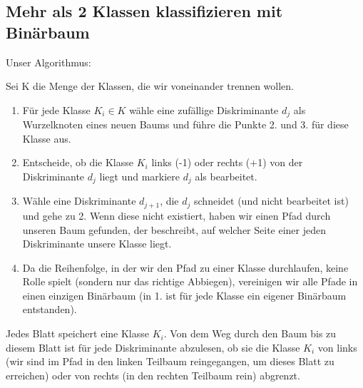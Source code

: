 \documentclass[12pt]{article}
\begin{document}
\newpage

\subsection{Mehr als 2 Klassen klassifizieren mit Bin\"arbaum}

Unser Algorithmus:

Sei K die Menge der Klassen, die wir voneinander trennen wollen.

\begin{enumerate}
\item F\"ur jede Klasse $K_i \in K$ wähle eine zuf\"allige Diskriminante $d_j$ als Wurzelknoten eines neuen Baums und f\"uhre die Punkte 2. und 3. f\"ur diese Klasse aus.
\item Entscheide, ob die Klasse $K_i$ links (-1) oder rechts (+1) von der Diskriminante $d_j$ liegt und markiere $d_j$ als bearbeitet.
\item W\"ahle eine Diskriminante $d_{j+1}$, die $d_j$ schneidet (und nicht bearbeitet ist) und gehe zu 2. Wenn diese nicht existiert, haben wir einen Pfad durch unseren Baum gefunden, der beschreibt, auf welcher Seite einer jeden Diskriminante unsere Klasse liegt.
\item Da die Reihenfolge, in der wir den Pfad zu einer Klasse durchlaufen, keine Rolle spielt (sondern nur das richtige Abbiegen), vereinigen wir alle Pfade in einen einzigen Bin\"arbaum (in 1. ist f\"ur jede Klasse ein eigener Bin\"arbaum entstanden).
\end{enumerate}
Jedes Blatt speichert eine Klasse $K_i$. Von dem Weg durch den Baum bis zu diesem Blatt ist f\"ur jede Diskriminante abzulesen, ob sie die Klasse $K_i$ von links (wir sind im Pfad in den linken Teilbaum reingegangen, um dieses Blatt zu erreichen) oder von rechts (in den rechten Teilbaum rein) abgrenzt.
\end{document}
